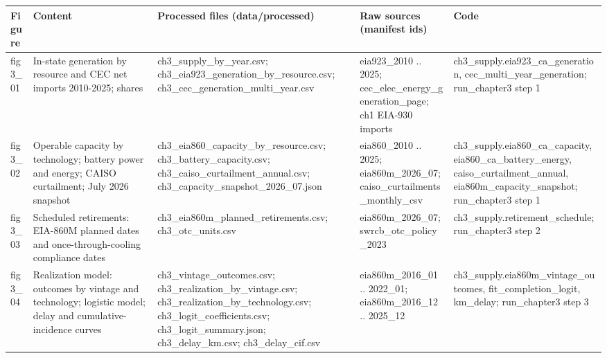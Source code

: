 \begin{tabular}{lp{4.6cm}p{5.2cm}p{4.6cm}p{4.8cm}}
\toprule
Figure & Content & Processed files (data/processed) & Raw sources (manifest ids) & Code \\
\midrule
fig3\_\allowbreak{}01 & In-state generation by resource and CEC net imports 2010-2025; shares & ch3\_\allowbreak{}supply\_\allowbreak{}by\_\allowbreak{}year.csv; ch3\_\allowbreak{}eia923\_\allowbreak{}generation\_\allowbreak{}by\_\allowbreak{}resource.csv; ch3\_\allowbreak{}cec\_\allowbreak{}generation\_\allowbreak{}multi\_\allowbreak{}year.csv & eia923\_\allowbreak{}2010 .. 2025; cec\_\allowbreak{}elec\_\allowbreak{}energy\_\allowbreak{}generation\_\allowbreak{}page; ch1 EIA-930 imports & ch3\_\allowbreak{}supply.eia923\_\allowbreak{}ca\_\allowbreak{}generation, cec\_\allowbreak{}multi\_\allowbreak{}year\_\allowbreak{}generation; run\_\allowbreak{}chapter3 step 1 \\
fig3\_\allowbreak{}02 & Operable capacity by technology; battery power and energy; CAISO curtailment; July 2026 snapshot & ch3\_\allowbreak{}eia860\_\allowbreak{}capacity\_\allowbreak{}by\_\allowbreak{}resource.csv; ch3\_\allowbreak{}battery\_\allowbreak{}capacity.csv; ch3\_\allowbreak{}caiso\_\allowbreak{}curtailment\_\allowbreak{}annual.csv; ch3\_\allowbreak{}capacity\_\allowbreak{}snapshot\_\allowbreak{}2026\_\allowbreak{}07.json & eia860\_\allowbreak{}2010 .. 2025; eia860m\_\allowbreak{}2026\_\allowbreak{}07; caiso\_\allowbreak{}curtailments\_\allowbreak{}monthly\_\allowbreak{}csv & ch3\_\allowbreak{}supply.eia860\_\allowbreak{}ca\_\allowbreak{}capacity, eia860\_\allowbreak{}ca\_\allowbreak{}battery\_\allowbreak{}energy, caiso\_\allowbreak{}curtailment\_\allowbreak{}annual, eia860m\_\allowbreak{}capacity\_\allowbreak{}snapshot; run\_\allowbreak{}chapter3 step 1 \\
fig3\_\allowbreak{}03 & Scheduled retirements: EIA-860M planned dates and once-through-cooling compliance dates & ch3\_\allowbreak{}eia860m\_\allowbreak{}planned\_\allowbreak{}retirements.csv; ch3\_\allowbreak{}otc\_\allowbreak{}units.csv & eia860m\_\allowbreak{}2026\_\allowbreak{}07; swrcb\_\allowbreak{}otc\_\allowbreak{}policy\_\allowbreak{}2023 & ch3\_\allowbreak{}supply.retirement\_\allowbreak{}schedule; run\_\allowbreak{}chapter3 step 2 \\
fig3\_\allowbreak{}04 & Realization model: outcomes by vintage and technology; logistic model; delay and cumulative-incidence curves & ch3\_\allowbreak{}vintage\_\allowbreak{}outcomes.csv; ch3\_\allowbreak{}realization\_\allowbreak{}by\_\allowbreak{}vintage.csv; ch3\_\allowbreak{}realization\_\allowbreak{}by\_\allowbreak{}technology.csv; ch3\_\allowbreak{}logit\_\allowbreak{}coefficients.csv; ch3\_\allowbreak{}logit\_\allowbreak{}summary.json; ch3\_\allowbreak{}delay\_\allowbreak{}km.csv; ch3\_\allowbreak{}delay\_\allowbreak{}cif.csv & eia860m\_\allowbreak{}2016\_\allowbreak{}01 .. 2022\_\allowbreak{}01; eia860m\_\allowbreak{}2016\_\allowbreak{}12 .. 2025\_\allowbreak{}12 & ch3\_\allowbreak{}supply.eia860m\_\allowbreak{}vintage\_\allowbreak{}outcomes, fit\_\allowbreak{}completion\_\allowbreak{}logit, km\_\allowbreak{}delay; run\_\allowbreak{}chapter3 step 3 \\

\end{tabular}
